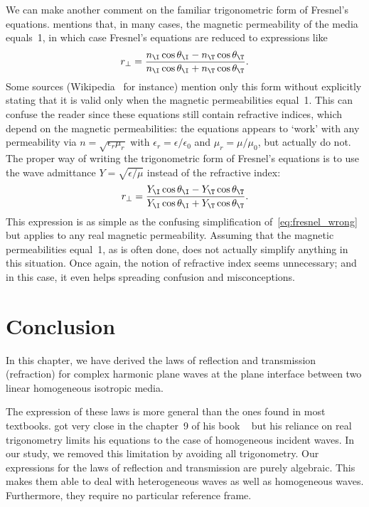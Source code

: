 We can make another comment on the familiar trigonometric form of Fresnel's equations.
\citeauthor{hecht2002optics} mentions that, in many cases, the magnetic permeability of the media equals~1, in which case Fresnel's equations are reduced to expressions like
\begin{equation}
    r_\perp
    =
    \frac{
        n_\I \cos \theta_\I
        -
        n_\T \cos \theta_\T
    }{
        n_\I \cos \theta_\I
        +
        n_\T \cos \theta_\T
    }
    \label{eq:fresnel_wrong}
    \text{.}
\end{equation}
Some sources (Wikipedia~\cite{wiki:fresnel} for instance) mention only this form without explicitly stating that it is valid only when the magnetic permeabilities equal~1.
This can confuse the reader since these equations still contain refractive indices, which depend on the magnetic permeabilities: the equations appears to `work' with any permeability via $n=\sqrt{\epsilon_r \mu_r}$ with $\epsilon_r = \epsilon / \epsilon_0$ and $\mu_r = \mu / \mu_0$, but actually do not.
The proper way of writing the trigonometric form of Fresnel's equations is to use the wave admittance $Y=\sqrt{\epsilon/\mu}$ instead of the refractive index:
\begin{equation}
    r_\perp
    =
    \frac{
        Y_\I \cos \theta_\I
        -
        Y_\T \cos \theta_\T
    }{
        Y_\I \cos \theta_\I
        +
        Y_\T \cos \theta_\T
    }
    \text{.}
\end{equation}
This expression is as simple as the confusing simplification of~\cref{eq:fresnel_wrong} but applies to any real magnetic permeability.
Assuming that the magnetic permeabilities equal~1, as is often done, does not actually simplify anything in this situation.
Once again, the notion of refractive index seems unnecessary; and in this case, it even helps spreading confusion and misconceptions.





\FloatBarrier
\section{Conclusion}
In this chapter, we have derived the laws of reflection and transmission (refraction) for complex harmonic plane waves at the plane interface between two linear homogeneous isotropic media.

The expression of these laws is more general than the ones found in most textbooks.
\citeauthor{stratton1941electromagnetic} got very close in the chapter~9 of his book
~\cite{stratton1941electromagnetic} but his reliance on real trigonometry limits his equations to the case of homogeneous incident waves.
In our study, we removed this limitation by avoiding all trigonometry.
Our expressions for the laws of reflection and transmission are purely algebraic.
This makes them able to deal with heterogeneous waves as well as homogeneous waves.
Furthermore, they require no particular reference frame.

